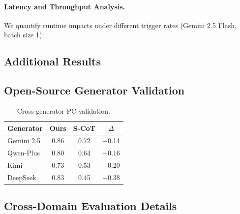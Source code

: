 \documentclass[11pt]{article}
\begin{document}
\begin{CJK*}{UTF8}{gbsn}
\paragraph{Latency and Throughput Analysis.} We quantify runtime impacts under different trigger rates (Gemini 2.5 Flash, batch size 1):

\begin{table}[h]
\centering
\small
{}
\caption{Latency-performance trade-offs. Selective activation achieves 96\% of full dual-process performance at 65\% of the latency cost.}
\label{tab:latency}
\end{table}


\subsection{Additional Results}
\label{sec:additional_results}

\subsection{Open-Source Generator Validation}
\label{sec:opensource}

\begin{table}[h]
\centering
\small
\begin{tabular}{lccc}
\toprule
\textbf{Generator} & \textbf{Ours} & \textbf{S-CoT} & \textbf{$\Delta$} \\
\midrule
Gemini 2.5 & 0.86 & 0.72 & +0.14 \\
Qwen-Plus & 0.80 & 0.64 & +0.16 \\
Kimi & 0.73 & 0.53 & +0.20 \\
DeepSeek & 0.83 & 0.45 & +0.38 \\
\bottomrule
\end{tabular}
\caption{Cross-generator PC validation.}
\label{tab:opensource_gen}
\end{table}

\subsection{Cross-Domain Evaluation Details}
\label{sec:crossdomain_details}


\end{CJK*}
\end{document}
